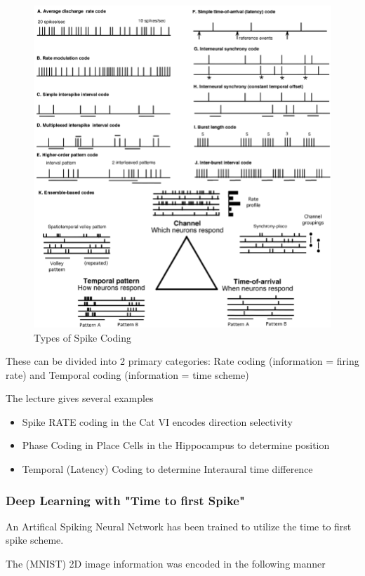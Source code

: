 \documentclass[main]{subfiles}
\begin{document}
\begin{figure}[H]
	\centering
	\includegraphics[width=0.9\linewidth]{09_WhySpikes/figures/TypesofSpikeCodings.png}
	\caption{Types of Spike Coding}
\end{figure}

These can be divided into 2 primary categories:
Rate coding (information = firing rate) and Temporal coding (information = time scheme)

The lecture gives several examples
\begin{itemize}
    \item Spike RATE coding in the Cat VI encodes direction selectivity
    \item Phase Coding in Place Cells in the Hippocampus to determine position
    \item Temporal (Latency) Coding to determine Interaural time difference 
\end{itemize}


\subsubsection{Deep Learning with "Time to first Spike"}

An Artifical Spiking Neural Network has been trained to utilize the time to first spike scheme.

The (MNIST) 2D image information was encoded in the following manner
\end{document}
